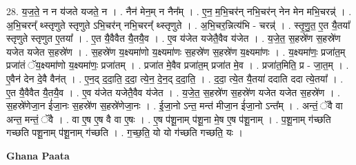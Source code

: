 \documentclass[17pt]{extarticle}
\begin{document}
28. य॒ज॒ते॒ न न य॑जते यजते॒ न । . नैन॑ मेन॒म् न नैन᳚म् । . ए॒न॒ म॒भि॒चर॑न् नभि॒चर॑न् नेन मेन मभि॒चरन्न्॑ । . अ॒भि॒चरन्᳚ थ्स्तृणुते स्तृणुते ऽभि॒चर॑न् नभि॒चरन्᳚ थ्स्तृणुते । . अ॒भि॒चर॒न्नित्य॑भि - चरन्न्॑ । . स्तृ॒णु॒त॒ ए॒त यै॒तया᳚ स्तृणुते स्तृणुत ए॒तया᳚ । . ए॒त यै॒वैवैत यै॒तयै॒व । . ए॒व य॑जेत यजेतै॒वैव य॑जेत । . य॒जे॒त॒ स॒हस्रे॑ण स॒हस्रे॑ण यजेत यजेत स॒हस्रे॑ण । . स॒हस्रे॑ण य॒क्ष्यमा॑णो य॒क्ष्यमा॑णः स॒हस्रे॑ण स॒हस्रे॑ण य॒क्ष्यमा॑णः । . य॒क्ष्यमा॑णः॒ प्रजा॑त॒म् प्रजा॑तं ॅय॒क्ष्यमा॑णो य॒क्ष्यमा॑णः॒ प्रजा॑तम् । . प्रजा॑त मे॒वैव प्रजा॑त॒म् प्रजा॑त मे॒व । . प्रजा॑त॒मिति॒ प्र - जा॒त॒म् । . ए॒वैन॑ देन दे॒वै वैन॑त् । . ए॒न॒द् द॒दा॒ति॒ द॒दा॒ त्ये॒न॒ दे॒न॒द् द॒दा॒ति॒ । . द॒दा॒ त्ये॒त यै॒तया॑ ददाति ददा त्ये॒तया᳚ । . ए॒त यै॒वैवैत यै॒तयै॒व । . ए॒व य॑जेत यजेतै॒वैव य॑जेत । . य॒जे॒त॒ स॒हस्रे॑ण स॒हस्रे॑ण यजेत यजेत स॒हस्रे॑ण । . स॒हस्रे॑णेजा॒न ई॑जा॒नः स॒हस्रे॑ण स॒हस्रे॑णेजा॒नः । . ई॒जा॒नो ऽन्त॒ मन्त॑ मीजा॒न ई॑जा॒नो ऽन्त᳚म् । . अन्तं॒ ॅवै वा अन्त॒ मन्तं॒ ॅवै । . वा ए॒ष ए॒ष वै वा ए॒षः । . ए॒ष प॑शू॒नाम् प॑शू॒ना मे॒ष ए॒ष प॑शू॒नाम् । . प॒शू॒नाम् ग॑च्छति गच्छति पशू॒नाम् प॑शू॒नाम् ग॑च्छति । . ग॒च्छ॒ति॒ यो यो ग॑च्छति गच्छति॒ यः । \newline

\textbf{Ghana Paata } \newline
\end{document}
